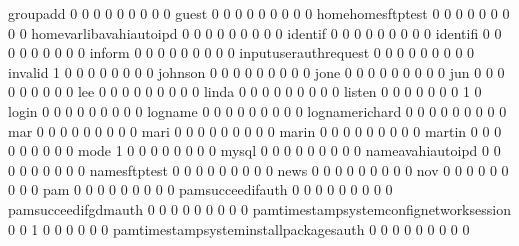 \documentclass[compress,8pt]{beamer}
\begin{document}
\begin{frame}
\begin{Schunk}
  groupadd                                   0   0   0   0   0   0   0   0   0
  guest                                      0   0   0   0   0   0   0   0   0
  homehomesftptest                           0   0   0   0   0   0   0   0   0
  homevarlibavahiautoipd                     0   0   0   0   0   0   0   0   0
  identif                                    0   0   0   0   0   0   0   0   0
  identifi                                   0   0   0   0   0   0   0   0   0
  inform                                     0   0   0   0   0   0   0   0   0
  inputuserauthrequest                       0   0   0   0   0   0   0   0   0
  invalid                                    1   0   0   0   0   0   0   0   0
  johnson                                    0   0   0   0   0   0   0   0   0
  jone                                       0   0   0   0   0   0   0   0   0
  jun                                        0   0   0   0   0   0   0   0   0
  lee                                        0   0   0   0   0   0   0   0   0
  linda                                      0   0   0   0   0   0   0   0   0
  listen                                     0   0   0   0   0   0   0   1   0
  login                                      0   0   0   0   0   0   0   0   0
  logname                                    0   0   0   0   0   0   0   0   0
  lognamerichard                             0   0   0   0   0   0   0   0   0
  mar                                        0   0   0   0   0   0   0   0   0
  mari                                       0   0   0   0   0   0   0   0   0
  marin                                      0   0   0   0   0   0   0   0   0
  martin                                     0   0   0   0   0   0   0   0   0
  mode                                       1   0   0   0   0   0   0   0   0
  mysql                                      0   0   0   0   0   0   0   0   0
  nameavahiautoipd                           0   0   0   0   0   0   0   0   0
  namesftptest                               0   0   0   0   0   0   0   0   0
  news                                       0   0   0   0   0   0   0   0   0
  nov                                        0   0   0   0   0   0   0   0   0
  pam                                        0   0   0   0   0   0   0   0   0
  pamsucceedifauth                           0   0   0   0   0   0   0   0   0
  pamsucceedifgdmauth                        0   0   0   0   0   0   0   0   0
  pamtimestampsystemconfignetworksession     0   0   1   0   0   0   0   0   0
  pamtimestampsysteminstallpackagesauth      0   0   0   0   0   0   0   0   0

\end{Schunk}
\end{frame}
\end{document}
